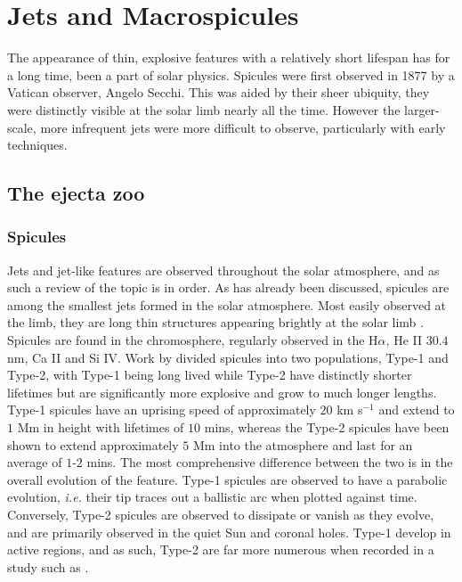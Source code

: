 



\chapter{Jets and Macrospicules}
\label{ch:2}



The appearance of thin, explosive features with a relatively short lifespan has for a long time, been a part of solar physics.
Spicules were first observed in 1877 by a Vatican observer, Angelo Secchi.
This was aided by their sheer ubiquity, they were distinctly visible at the solar limb nearly all the time.
However the larger-scale, more infrequent jets were more difficult to observe, particularly with early techniques.

\section{The ejecta zoo}


\subsection{Spicules}
Jets and jet-like features are observed throughout the solar atmosphere, and as such a review of the topic is in order.
As has already been discussed, spicules are among the smallest jets formed in the solar atmosphere. 
Most easily observed at the limb, they are long thin structures appearing brightly at the solar limb \cite{Beckers1972}.
Spicules are found in the chromosphere, regularly observed in the H$\alpha$, He II $30.4$ nm, Ca II and Si IV.
Work by \cite{DePontieu2007} divided spicules into two populations, Type-1 and Type-2, with Type-1 being long lived while Type-2 have distinctly shorter lifetimes but are significantly more explosive and grow to much longer lengths.
Type-1 spicules have an uprising speed of approximately $20$ km s$^{-1}$ and extend to $1$ Mm in height with lifetimes of $10$ mins, whereas the Type-2 spicules have been shown to extend approximately $5$ Mm into the atmosphere and last for an average of $1$-$2$ mins. 
The most comprehensive difference between the two is in the overall evolution of the feature.
Type-1 spicules are observed to have a parabolic evolution, \emph{i.e.} their tip traces out a ballistic arc when plotted against time.
Conversely, Type-2 spicules are observed to dissipate or vanish as they evolve, and are primarily observed in the quiet Sun and coronal holes.
Type-1 develop in active regions, and as such, Type-2 are far more numerous when recorded in a study such as \cite{Pereira2012}.

